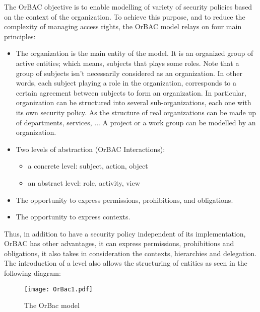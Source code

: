 \documentclass{acm_proc_article-sp}
\begin{document}
The OrBAC objective is to enable modelling of variety of security policies based on the context of the organization. To achieve this purpose, and to reduce the complexity of managing access rights, the OrBAC model relays on four main principles:
\begin{itemize}
 \item The organization is the main entity of the model. It is an organized group of active entities; which means, subjects that plays some roles. Note that a group of subjects isn't necessarily considered as an organization. In other words, each subject playing a role in the organization, corresponds to a certain agreement between subjects to form an organization. In particular, organization can be structured into several sub-organizations, each one with its own security policy. As the structure of real organizations can be made up of departments, services, ...  A project or a work group can be modelled by an organization.
 \item Two levels of abstraction (OrBAC Interactions):
 \begin{itemize}
  \item a concrete level: subject, action, object
  \item an abstract level: role, activity, view
 \end{itemize}
 \item The opportunity to express permissions, prohibitions, and obligations.
 \item The opportunity to express contexts.
\end{itemize}
Thus, in addition to have a security policy independent of its implementation, OrBAC has other advantages, it can express permissions, prohibitions and obligations, it also takes in consideration the contexts, hierarchies and delegation.\\
The introduction of a level also allows the structuring of entities as seen in the following diagram:
\newpage                                                                 \begin{figure}[h!]                                                       \centering                                                               \texttt{[image: OrBac1.pdf]}                     \caption{The OrBac model}                                                \label{The OrBac model}                                                  \end{figure}                                                             
\end{document}
